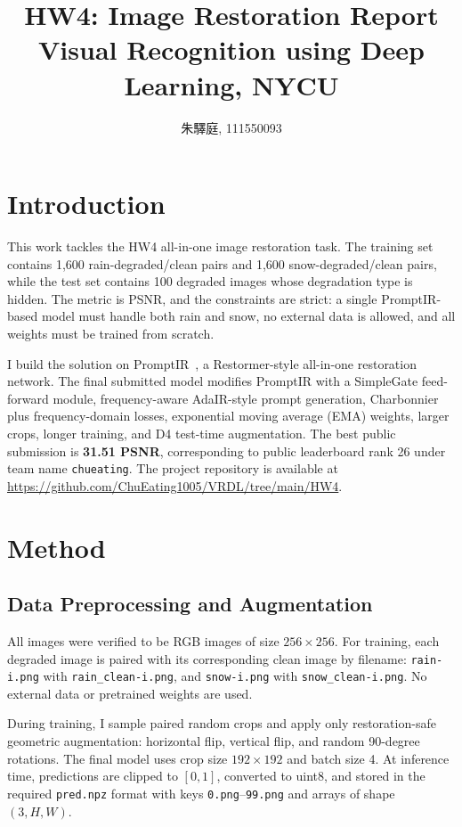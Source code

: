 \documentclass[10pt,twocolumn,letterpaper]{article}
\begin{document}
\title{\LARGE HW4: Image Restoration Report \\[0.5em] \large Visual Recognition using Deep Learning, NYCU}
\author{朱驛庭, 111550093}
\maketitle

\section{Introduction}
\label{sec:intro}

This work tackles the HW4 all-in-one image restoration task. The training set contains 1{,}600 rain-degraded/clean pairs and 1{,}600 snow-degraded/clean pairs, while the test set contains 100 degraded images whose degradation type is hidden. The metric is PSNR, and the constraints are strict: a single PromptIR-based model must handle both rain and snow, no external data is allowed, and all weights must be trained from scratch.

I build the solution on PromptIR~\cite{potlapalli2023promptir}, a Restormer-style all-in-one restoration network. The final submitted model modifies PromptIR with a SimpleGate feed-forward module, frequency-aware AdaIR-style prompt generation, Charbonnier plus frequency-domain losses, exponential moving average (EMA) weights, larger crops, longer training, and D4 test-time augmentation. The best public submission is \textbf{31.51 PSNR}, corresponding to public leaderboard rank 26 under team name \texttt{chueating}. The project repository is available at \url{https://github.com/ChuEating1005/VRDL/tree/main/HW4}.

\section{Method}
\label{sec:method}

\subsection{Data Preprocessing and Augmentation}
All images were verified to be RGB images of size $256\times256$. For training, each degraded image is paired with its corresponding clean image by filename: \texttt{rain-i.png} with \texttt{rain\_clean-i.png}, and \texttt{snow-i.png} with \texttt{snow\_clean-i.png}. No external data or pretrained weights are used.

During training, I sample paired random crops and apply only restoration-safe geometric augmentation: horizontal flip, vertical flip, and random 90-degree rotations. The final model uses crop size $192\times192$ and batch size 4. At inference time, predictions are clipped to $[0,1]$, converted to uint8, and stored in the required \texttt{pred.npz} format with keys \texttt{0.png}--\texttt{99.png} and arrays of shape $(3,H,W)$.
\end{document}
